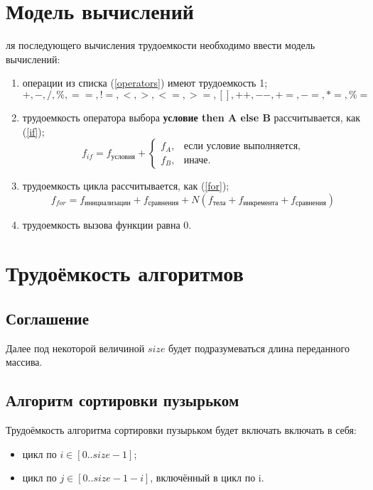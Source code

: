 \documentclass[12pt]{report}
\begin{document}
\newpage

\section{Модель вычислений}
ля последующего вычисления трудоемкости необходимо ввести модель вычислений:
\begin{enumerate}
    \item операции из списка (\ref{operators}) имеют трудоемкость 1;
        \begin{equation}
            \label{operators}
            +, -, /, \%, ==, !=, <, >, <=, >=, [], ++, {-}-, +=, -=, *=, \%=
        \end{equation}
    \item трудоемкость оператора выбора \textbf{условие then A else B} рассчитывается, как (\ref{if});
	\begin{equation}
        \label{if}
        f_{if} = f_{\text{условия}} +
        \begin{cases}
        f_A, & \text{если условие выполняется,}\\
        f_B, & \text{иначе.}
        \end{cases}
	\end{equation}
\item трудоемкость цикла рассчитывается, как (\ref{for});
    \begin{equation}
        \label{for}
        f_{for} = f_{\text{инициализации}} + f_{\text{сравнения}} + N(f_{\text{тела}} + f_{\text{инкремента}} + f_{\text{сравнения}})
    \end{equation}
	\item трудоемкость вызова функции равна 0.
\end{enumerate}

\section{Трудоёмкость алгоритмов}
\subsection{Соглашение}
Далее под некоторой величиной $size$ будет подразумеваться длина переданного массива.

\subsection{Алгоритм сортировки пузырьком}
Трудоёмкость алгоритма сортировки пузырьком будет включать включать в себя:
\begin{itemize}
\item цикл по $i \in [0..size - 1]$;
\item цикл по $j \in [0.. size - 1 - i]$, включённый в цикл по i.
\end{itemize}
\end{document}
